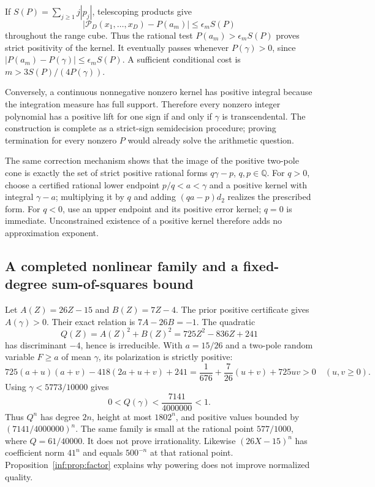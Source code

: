 \documentclass[11pt,a4paper]{article}
\newcommand{\Q}{\mathbb Q}
\theoremstyle{definition}
\theoremstyle{remark}
\numberwithin{equation}{section}
\begin{document}
If $S(P)=\sum_{j\ge1}j|p_j|$, telescoping products give
\[
 |\mathcal P_D(x_1,\ldots,x_D)-P(a_m)|\le\epsilon_mS(P)
\]
throughout the range cube. Thus the rational test $P(a_m)>\epsilon_mS(P)$ proves strict positivity of the kernel. It eventually passes whenever $P(\gamma)>0$, since $|P(a_m)-P(\gamma)|\le\epsilon_mS(P)$. A sufficient conditional cost is $m>3S(P)/(4P(\gamma))$.

Conversely, a continuous nonnegative nonzero kernel has positive integral because the integration measure has full support. Therefore every nonzero integer polynomial has a positive lift for one sign if and only if $\gamma$ is transcendental. The construction is complete as a strict-sign semidecision procedure; proving termination for every nonzero $P$ would already solve the arithmetic question.

The same correction mechanism shows that the image of the positive two-pole cone is exactly the set of strict positive rational forms $q\gamma-p$, $q,p\in\Q$. For $q>0$, choose a certified rational lower endpoint $p/q<a<\gamma$ and a positive kernel with integral $\gamma-a$; multiplying it by $q$ and adding $(qa-p)d_2$ realizes the prescribed form. For $q<0$, use an upper endpoint and its positive error kernel; $q=0$ is immediate. Unconstrained existence of a positive kernel therefore adds no approximation exponent.

\subsection{A completed nonlinear family and a fixed-degree sum-of-squares bound}
\label{inf:sub:sos}
Let $A(Z)=26Z-15$ and $B(Z)=7Z-4$. The prior positive certificate gives $A(\gamma)>0$. Their exact relation is $7A-26B=-1$. The quadratic
\[
 Q(Z)=A(Z)^2+B(Z)^2=725Z^2-836Z+241
\]
has discriminant $-4$, hence is irreducible. With $a=15/26$ and a two-pole random variable $F\ge a$ of mean $\gamma$, its polarization is strictly positive:
\[
 725(a+u)(a+v)-418(2a+u+v)+241
 =\frac1{676}+\frac7{26}(u+v)+725uv>0\quad(u,v\ge0).
\]
Using $\gamma<5773/10000$ gives
\[
 0<Q(\gamma)<\frac{7141}{4000000}<1.
\]
Thus $Q^n$ has degree $2n$, height at most $1802^n$, and positive values bounded by $(7141/4000000)^n$. The same family is small at the rational point $577/1000$, where $Q=61/40000$. It does not prove irrationality. Likewise $(26X-15)^n$ has coefficient norm $41^n$ and equals $500^{-n}$ at that rational point. Proposition~\ref{inf:prop:factor} explains why powering does not improve normalized quality.
\end{document}

